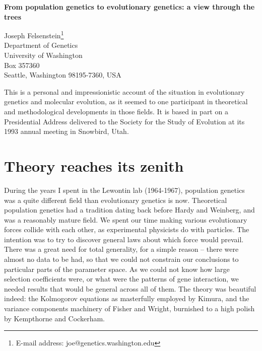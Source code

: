 \documentclass[12pt]{article}
\begin{document}
\centerline{\bf From population genetics to evolutionary genetics: a
view through the trees}
\bigskip

\begin{center}
Joseph Felsenstein\footnote{E-mail address: joe@genetics.washington.edu}\\
Department of Genetics\\
University of Washington\\
Box 357360\\
Seattle, Washington 98195-7360, USA
\end{center}
\newpage


This is a personal and impressionistic account of the situation in
evolutionary genetics and molecular evolution, as it seemed to one
participant in theoretical and methodological developments in those
fields.  It is based in part on a Presidential Address delivered to the
Society for the Study of Evolution at its 1993 annual meeting in
Snowbird, Utah.

\section*{Theory reaches its zenith}

During the years I spent in the Lewontin lab (1964-1967), population genetics was
a quite different field than evolutionary genetics is now.  Theoretical
population genetics had a tradition dating back before Hardy and
Weinberg, and was a reasonably mature field.  We spent our time making various
evolutionary forces collide with each other, as experimental physicists do with
particles.  The intention was to try to discover general laws about which force
would prevail.   There was a great need for total generality, for a simple reason --
there were almost no data to be had, so that we could not constrain
our conclusions to particular parts of the parameter space.  As we could not
know how large selection coefficients were, or what were the patterns of
gene interaction, we needed results that would be general across all of
them.  The theory was
beautiful indeed: the Kolmogorov equations as masterfully employed by Kimura,
and the variance components machinery of Fisher and Wright, burnished to a high
polish by Kempthorne and Cockerham.
\end{document}
